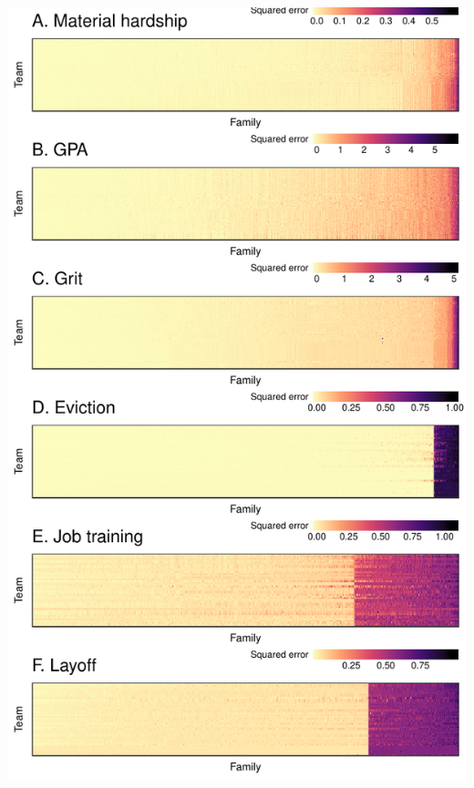 \documentclass{beamer}
\begin{document}
\begin{frame}
\includegraphics[width = \textwidth, trim = {0 5.37in 0 1.3in}, clip]{figures/4_heatmaps_sqerr_6outcomes}
\end{frame}
\end{document}
